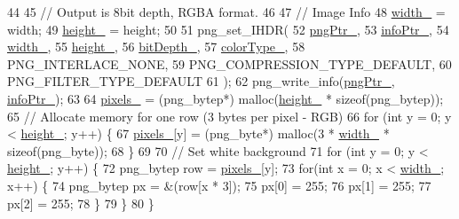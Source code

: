 \begin{DoxyCode}
44 
45     \textcolor{comment}{// Output is 8bit depth, RGBA format.}
46 
47     \textcolor{comment}{// Image Info}
48     \mbox{\hyperlink{class_image_a4c2d8a01ecf1b7438f57f93357080e08}{width\_}} = width;
49     \mbox{\hyperlink{class_image_a64a699c5bb8e8a18c6971a8032806dba}{height\_}} = height;
50 
51     png\_set\_IHDR(
52         \mbox{\hyperlink{class_image_aaf607d2596bac09b13370599d9ba6d8c}{pngPtr\_}}, 
53         \mbox{\hyperlink{class_image_a505878e5e19500e3cc1b940067faa584}{infoPtr\_}}, 
54         \mbox{\hyperlink{class_image_a4c2d8a01ecf1b7438f57f93357080e08}{width\_}}, 
55         \mbox{\hyperlink{class_image_a64a699c5bb8e8a18c6971a8032806dba}{height\_}}, 
56         \mbox{\hyperlink{class_image_ae472f0390f64eb5d49f858ce95e09ce8}{bitDepth\_}}, 
57         \mbox{\hyperlink{class_image_a94b0dece808a9f06ebb6f4394e8e3048}{colorType\_}}, 
58         PNG\_INTERLACE\_NONE, 
59         PNG\_COMPRESSION\_TYPE\_DEFAULT, 
60         PNG\_FILTER\_TYPE\_DEFAULT
61     );
62     png\_write\_info(\mbox{\hyperlink{class_image_aaf607d2596bac09b13370599d9ba6d8c}{pngPtr\_}}, \mbox{\hyperlink{class_image_a505878e5e19500e3cc1b940067faa584}{infoPtr\_}});
63 
64     \mbox{\hyperlink{class_image_a51351c8507499d09cb9667c20ef01faf}{pixels\_}} = (png\_bytep*) malloc(\mbox{\hyperlink{class_image_a64a699c5bb8e8a18c6971a8032806dba}{height\_}} * \textcolor{keyword}{sizeof}(png\_bytep));
65     \textcolor{comment}{// Allocate memory for one row (3 bytes per pixel - RGB)}
66     \textcolor{keywordflow}{for} (\textcolor{keywordtype}{int} y = 0; y < \mbox{\hyperlink{class_image_a64a699c5bb8e8a18c6971a8032806dba}{height\_}}; y++) \{
67         \mbox{\hyperlink{class_image_a51351c8507499d09cb9667c20ef01faf}{pixels\_}}[y] = (png\_byte*) malloc(3 * \mbox{\hyperlink{class_image_a4c2d8a01ecf1b7438f57f93357080e08}{width\_}} * \textcolor{keyword}{sizeof}(png\_byte));
68     \}
69 
70     \textcolor{comment}{// Set white background}
71     \textcolor{keywordflow}{for} (\textcolor{keywordtype}{int} y = 0; y < \mbox{\hyperlink{class_image_a64a699c5bb8e8a18c6971a8032806dba}{height\_}}; y++) \{
72         png\_bytep row = \mbox{\hyperlink{class_image_a51351c8507499d09cb9667c20ef01faf}{pixels\_}}[y];
73         \textcolor{keywordflow}{for}(\textcolor{keywordtype}{int} x = 0; x < \mbox{\hyperlink{class_image_a4c2d8a01ecf1b7438f57f93357080e08}{width\_}}; x++) \{
74             png\_bytep px = \&(row[x * 3]);
75             px[0] = 255;
76             px[1] = 255;
77             px[2] = 255;
78         \}
79     \}
80 \}
\end{DoxyCode}
\mbox{\label{class_image_a7d0a9bb68362e0ec28d5d2c600cc9b59}} 
